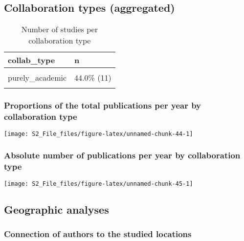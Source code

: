\documentclass[
]{article}
\begin{document}
\hypertarget{collaboration-types-aggregated}{%
\subsection{Collaboration types
(aggregated)}\label{collaboration-types-aggregated}}

\begin{table}[H]

\caption{\label{tab:unnamed-chunk-43}Number of studies per collaboration type}
\centering
\begin{tabular}[t]{ll}
\toprule
collab\_type & n\\
\midrule
\cellcolor{gray!6}{mixed} & \cellcolor{gray!6}{56.0\% (14)}\\
purely\_academic & 44.0\% (11)\\
\cellcolor{gray!6}{Total} & \cellcolor{gray!6}{100.0\% (25)}\\
\bottomrule
\end{tabular}
\end{table}

\hypertarget{proportions-of-the-total-publications-per-year-by-collaboration-type}{%
\subsubsection{Proportions of the total publications per year by
collaboration
type}\label{proportions-of-the-total-publications-per-year-by-collaboration-type}}

\texttt{[image: S2\_File\_files/figure-latex/unnamed-chunk-44-1]}

\hypertarget{absolute-number-of-publications-per-year-by-collaboration-type}{%
\subsubsection{Absolute number of publications per year by collaboration
type}\label{absolute-number-of-publications-per-year-by-collaboration-type}}

\texttt{[image: S2\_File\_files/figure-latex/unnamed-chunk-45-1]}

\hypertarget{geographic-analyses-1}{%
\subsection{Geographic analyses}\label{geographic-analyses-1}}

\hypertarget{connection-of-authors-to-the-studied-locations-1}{%
\subsubsection{Connection of authors to the studied
locations}\label{connection-of-authors-to-the-studied-locations-1}}
\end{document}
